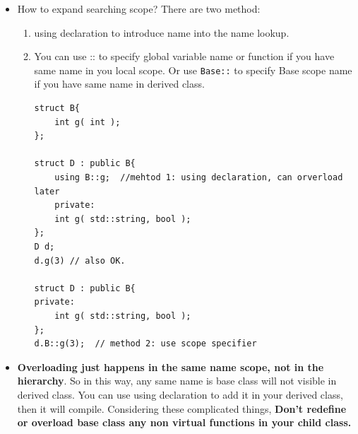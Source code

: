 \documentclass[a4paper,11pt,twoside]{book}
\begin{document}
\begin{itemize}
\begin{enumerate}
	\end{enumerate}
	

	
	\item How to expand searching scope?  There are two method:
	\begin{enumerate}
		\item using declaration to introduce name into the name lookup.
		
		\item You can use :: to specify global variable name or function if you have same name in you local scope.  Or use \texttt{Base::} to specify Base scope name if you have same name in derived class.
\begin{lstlisting}
struct B{
	int g( int );
};

struct D : public B{ 
	using B::g;  //mehtod 1: using declaration, can orverload later
	private:
	int g( std::string, bool );
};
D d; 
d.g(3) // also OK. 

struct D : public B{
private:
	int g( std::string, bool );
};
d.B::g(3);  // method 2: use scope specifier 
\end{lstlisting}
		
	\end{enumerate}

	\item  \textbf{Overloading just happens in the same name scope, not in the hierarchy}. So in this way, any same name is base class will not visible in derived class. You can use using declaration to add it in your derived class, then it will compile. Considering these complicated things, \textbf{Don't redefine or overload base class any non virtual functions in your child class.}

\end{itemize}
\end{document}

